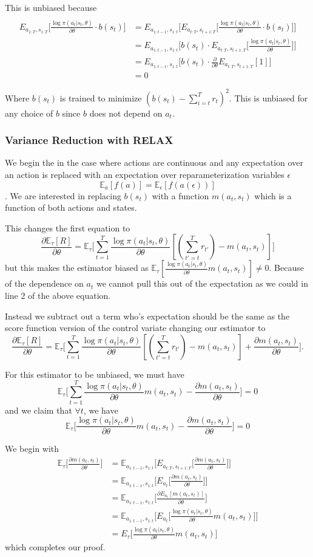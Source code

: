 \documentclass{article}
\newcommand{\E}{\mathbb{E}}
\newcommand{\LL}[1]{\frac{\log \pi(a_{#1}| s_{#1}, \theta)}{\partial \theta}}
\begin{document}
This is unbiased because
\begin{align}
\\E_{a_{1:T},s_{1:T}}\Big[\LL{t}\cdot b(s_t)\Big] &= E_{a_{1:t-1},s_{1:t}}\Big[ E_{a_{t:T},s_{t+1:T}} \Big[\LL{t}\cdot b(s_t)\Big]\Big]\\
&= E_{a_{1:t-1},s_{1:t}}\Big[b(s_t)\cdot E_{a_{t:T},s_{t+1:T}} \Big[\LL{t}\Big]\Big]\\
&= E_{a_{1:t-1},s_{1:t}}\Big[b(s_t)\cdot \frac{\partial}{\partial \theta} E_{a_{t:T},s_{t+1:T}} [1]\Big]\\
&= 0
\end{align}

Where $b(s_t)$ is trained to minimize $(b(s_t) - \sum_{i=t}^T r_t)^2.$ This is unbiased for any choice of $b$ since $b$ does not depend on $a_t$. 

\subsubsection{Variance Reduction with RELAX}
We begin the in the case where actions are continuous and any expectation over an action is replaced with an expectation over reparameterization variables $\epsilon$ $$\E_a[f(a)] = \E_\epsilon[f(a(\epsilon))]$$.  We are interested in replacing $b(s_t)$ with a function $m(a_t, s_t)$ which is a function of both actions and states.

This changes the first equation to $$\frac{\partial \E_\tau[R]}{\partial \theta} = \E_\tau\Big[\sum_{t=1}^T \LL{t} [(\sum_{t'=t}^T r_{t'}) - m(a_t, s_t)]\Big]$$ but this makes the estimator biased as $\E_\tau [\LL{t}m(a_t, s_t)] \neq 0$. Because of the dependence on $a_t$ we cannot pull this out of the expectation as we could in line 2 of the above equation.

Instead we subtract out a term who's expectation should be the same as the score function version of the control variate changing our estimator to  $$\frac{\partial \E_\tau[R]}{\partial \theta} = \E_\tau\Big[\sum_{t=1}^T \LL{t} [(\sum_{t'=t}^T r_{t'}) - m(a_t, s_t)] + \frac{\partial m(a_t, s_t)}{\partial\theta}\Big].$$ 

For this estimator to be unbiased, we must have $$\E_\tau\Big[\sum_{t=1}^T \LL{t} m(a_t, s_t) - \frac{\partial m(a_t, s_t)}{\partial\theta}\Big] = 0$$ and we claim that $\forall t$, we have $$\E_\tau\Big[\LL{t} m(a_t, s_t) - \frac{\partial m(a_t, s_t)}{\partial\theta}\Big] = 0$$

We begin with 
\begin{align}
\E_\tau\Big[\frac{\partial m(a_t, s_t)}{\partial\theta}\Big] &= \E_{a_{1:t-1},s_{1:t}}\Big[E_{a_{t:T},s_{t+1:T}}\Big[\frac{\partial m(a_t, s_t)}{\partial\theta}\Big]\Big]\\
&= \E_{a_{1:t-1},s_{1:t}}\Big[E_{a_t}\Big[\frac{\partial m(a_t, s_t)}{\partial\theta}\Big]\Big]\\
&=  \E_{a_{1:t-1},s_{1:t}}\Big[\frac{\partial{E_{a_t}[m(a_t, s_t)]}}{\partial \theta}\Big]\\
&= \E_{a_{1:t-1},s_{1:t}}\Big[E_{a_t}\Big[\LL{t} m(a_t, s_t)\Big]\Big]\\
&= E_\tau\Big[\LL{t} m(a_t, s_t)\Big]
\end{align}
which completes our proof.
\end{document}
